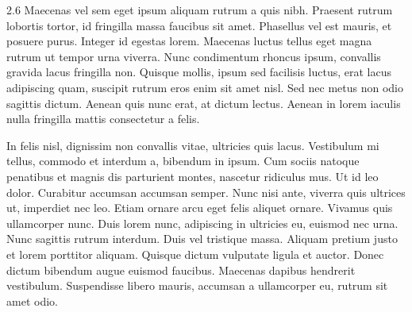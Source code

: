 \documentclass[a0]{a0poster}
\begin{document}
\begin{area3}{2.6}
Maecenas vel sem eget ipsum aliquam rutrum a quis nibh. Praesent rutrum lobortis tortor, id fringilla massa faucibus sit amet. Phasellus vel est mauris, et posuere purus. Integer id egestas lorem. Maecenas luctus tellus eget magna rutrum ut tempor urna viverra. Nunc condimentum rhoncus ipsum, convallis gravida lacus fringilla non. Quisque mollis, ipsum sed facilisis luctus, erat lacus adipiscing quam, suscipit rutrum eros enim sit amet nisl. Sed nec metus non odio sagittis dictum. Aenean quis nunc erat, at dictum lectus. Aenean in lorem iaculis nulla fringilla mattis consectetur a felis.

In felis nisl, dignissim non convallis vitae, ultricies quis lacus. Vestibulum mi tellus, commodo et interdum a, bibendum in ipsum. Cum sociis natoque penatibus et magnis dis parturient montes, nascetur ridiculus mus. Ut id leo dolor. Curabitur accumsan accumsan semper. Nunc nisi ante, viverra quis ultrices ut, imperdiet nec leo. Etiam ornare arcu eget felis aliquet ornare. Vivamus quis ullamcorper nunc. Duis lorem nunc, adipiscing in ultricies eu, euismod nec urna. Nunc sagittis rutrum interdum. Duis vel tristique massa. Aliquam pretium justo et lorem porttitor aliquam. Quisque dictum vulputate ligula et auctor. Donec dictum bibendum augue euismod faucibus. Maecenas dapibus hendrerit vestibulum. Suspendisse libero mauris, accumsan a ullamcorper eu, rutrum sit amet odio.

\end{area3}

\end{document}
